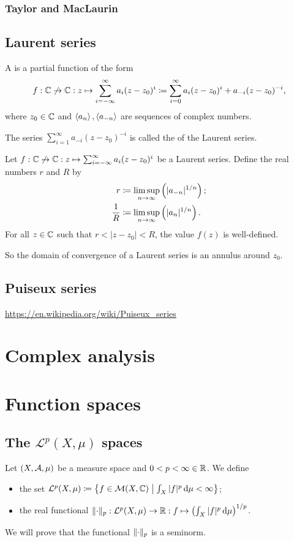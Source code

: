 \subsection{Taylor and MacLaurin}
\section{Laurent series}
\begin{definition}
A  is a partial function of the form
\[ f: \mathbb{C}\not\to \mathbb{C}: z\mapsto \sum_{i=-\infty}^\infty a_i(z-z_0)^i \coloneqq \sum_{i=0}^\infty a_i(z-z_0)^i + a_{-i}(z-z_0)^{-i}, \]
where $z_0\in \mathbb{C}$ and $\left\langle a_n \right\rangle, \left\langle a_{-n} \right\rangle$ are sequences of complex numbers.

The series $\sum_{i=1}^\infty a_{-i}(z-z_0)^{-i}$ is called the  of the Laurent series.
\end{definition}

\begin{proposition} \label{LaurentSeriesConvergence}
Let $f: \mathbb{C}\not\to \mathbb{C}: z\mapsto \sum_{i=-\infty}^\infty a_i(z-z_0)^i$ be a Laurent series. Define the real numbers $r$ and $R$ by
\begin{align*}
r &\coloneqq \limsup_{n\to\infty}\left(|a_{-n}|^{1/n}\right); \\
\frac{1}{R} &\coloneqq \limsup_{n\to\infty}\left(|a_n|^{1/n}\right).
\end{align*}
For all $z\in \mathbb{C}$ such that $r < |z-z_0| < R$, the value $f(z)$ is well-defined.
\end{proposition}
So the domain of convergence of a Laurent series is an annulus around $z_0$.

\section{Puiseux series}
\url{https://en.wikipedia.org/wiki/Puiseux_series}

\chapter{Complex analysis}


\chapter{Function spaces}
\section{The $\mathcal{L}^p(X,\mu)$ spaces}
\begin{definition}
Let $\sSet{X,\mathcal{A},\mu}$ be a measure space and $0<p<\infty \in \mathbb{R}$. We define
\begin{itemize}
\item the set $\mathcal{L}^p(X,\mu) \defeq \setbuilder{f\in \meas(X,\C)}{\int_X |f|^p\diff{\mu} <\infty}$;
\item the real functional $\lVert\cdot\rVert_{p}: \mathcal{L}^p(X,\mu)\to \mathbb{R}: f\mapsto \left(\int_X |f|^p\operatorname{d \!}{\mu}\right)^{1/p}$.
\end{itemize}
\end{definition}
We will prove that the functional $\lVert\cdot\rVert_{p}$ is a seminorm.

